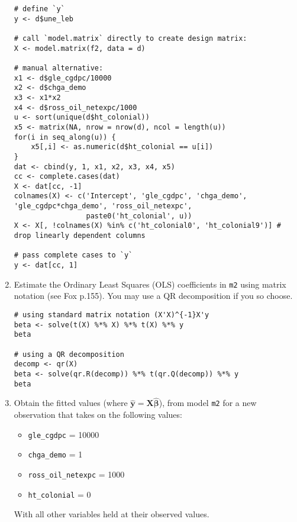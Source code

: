 \documentclass[a4paper,12pt]{article}
\newcommand{\matr}[1]{\mathbf{#1}}
\begin{document}
\begin{enumerate}
\begin{solution}
\begin{lstlisting}
# define `y`
y <- d$une_leb

# call `model.matrix` directly to create design matrix:
X <- model.matrix(f2, data = d)

# manual alternative:
x1 <- d$gle_cgdpc/10000
x2 <- d$chga_demo
x3 <- x1*x2
x4 <- d$ross_oil_netexpc/1000
u <- sort(unique(d$ht_colonial))
x5 <- matrix(NA, nrow = nrow(d), ncol = length(u))
for(i in seq_along(u)) {
    x5[,i] <- as.numeric(d$ht_colonial == u[i])
}
dat <- cbind(y, 1, x1, x2, x3, x4, x5)
cc <- complete.cases(dat)
X <- dat[cc, -1]
colnames(X) <- c('Intercept', 'gle_cgdpc', 'chga_demo', 'gle_cgdpc*chga_demo', 'ross_oil_netexpc',
                 paste0('ht_colonial', u))
X <- X[, !colnames(X) %in% c('ht_colonial0', 'ht_colonial9')] # drop linearly dependent columns

# pass complete cases to `y`
y <- dat[cc, 1]
\end{lstlisting}
\end{solution}


\item Estimate the Ordinary Least Squares (OLS) coefficients in \texttt{m2} using matrix notation (see Fox p.155). You may use a QR decomposition if you so choose.

\begin{solution}
\begin{lstlisting}
# using standard matrix notation (X'X)^{-1}X'y
beta <- solve(t(X) %*% X) %*% t(X) %*% y
beta

# using a QR decomposition
decomp <- qr(X)
beta <- solve(qr.R(decomp)) %*% t(qr.Q(decomp)) %*% y
beta
\end{lstlisting}
\end{solution}

\item Obtain the fitted values (where $\matr{\hat{y}} = \matr{X}\matr{\hat{\beta}}$), from model \texttt{m2} for a new observation that takes on the following values:

\begin{itemize}
\item \texttt{gle\_cgdpc} = 10000
\item \texttt{chga\_demo} = 1
\item \texttt{ross\_oil\_netexpc} = 1000
\item \texttt{ht\_colonial} = 0
\end{itemize}

With all other variables held at their observed values.


\end{enumerate}
\end{document}
